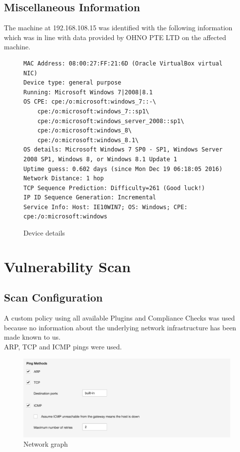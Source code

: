 \documentclass[11pt, oneside]{article}   	%
\newcommand{\clientName}{OHNO PTE LTD}
\begin{document}
\subsection{Miscellaneous Information}
The machine at 192.168.108.15 was identified with the following information which was 
in line with data provided by \clientName{} on the affected machine.
\begin{figure}[h!]
	\fontsize{8pt}{4pt}
	\begin{verbatim}
MAC Address: 08:00:27:FF:21:6D (Oracle VirtualBox virtual NIC)
Device type: general purpose
Running: Microsoft Windows 7|2008|8.1
OS CPE: cpe:/o:microsoft:windows_7::-\
	cpe:/o:microsoft:windows_7::sp1\
	cpe:/o:microsoft:windows_server_2008::sp1\
	cpe:/o:microsoft:windows_8\
	cpe:/o:microsoft:windows_8.1\
OS details: Microsoft Windows 7 SP0 - SP1, Windows Server 2008 SP1, Windows 8, or Windows 8.1 Update 1
Uptime guess: 0.602 days (since Mon Dec 19 06:18:05 2016)
Network Distance: 1 hop
TCP Sequence Prediction: Difficulty=261 (Good luck!)
IP ID Sequence Generation: Incremental
Service Info: Host: IE10WIN7; OS: Windows; CPE: cpe:/o:microsoft:windows
	\end{verbatim}
	\caption{Device details}
\end{figure}

\clearpage
\section{Vulnerability Scan}

\subsection{Scan Configuration}
A custom policy using all available Plugins and Compliance Checks was used because
no information about the underlying network infrastructure has been made known to us.\\

ARP, TCP and ICMP pings were used.

\begin{figure}[h!]
	\centering
	\includegraphics[width=380pt]{ping-methods.png}
	\caption{Network graph}
	\label{NetworkGraph}
\end{figure}
\end{document}

